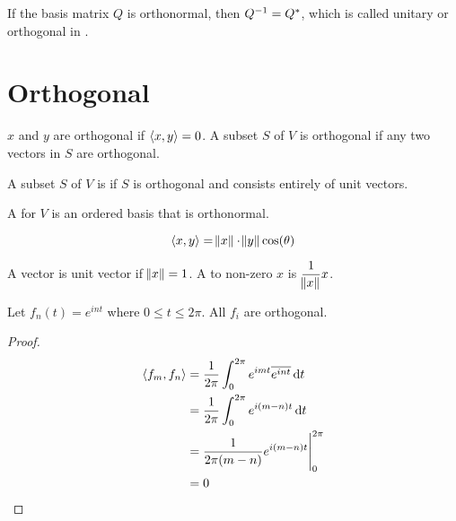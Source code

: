 If the basis matrix $Q$ is orthonormal, then ${Q}^{-1} = Q^*$, which is called unitary or orthogonal in .



\section{Orthogonal}

\begin{definition}
    $x$ and $y$ are orthogonal if $\innerproduct{x}{y} = 0$. A subset $S$ of $V$ is orthogonal if any two vectors in $S$ are orthogonal. 
    
    A subset $S$ of $V$ is  if $S$ is orthogonal and consists entirely of unit vectors.
    
    A  for $V$ is an ordered basis that is orthonormal.
\end{definition}


\begin{definition}
    \begin{equation}
        \innerproduct{x}{y} = \norm{x} \cdot \norm{y} \text{cos}(\theta)
    \end{equation}    
\end{definition}


\begin{definition}
	A vector is unit vector if $\norm{x} = 1$. A  to non-zero $x$ is $\dfrac{1}{\norm{x}} x$.
\end{definition}


\begin{theorem}
    Let $f_n (t) = e^{i nt}$ where $0 \leq t \leq 2 \pi$. All $f_i$ are orthogonal.
\end{theorem}
\begin{proof}
    \begin{equation}
        \begin{aligned}
            \innerproduct{f_m}{f_n} &= \frac{1}{2 \pi} \int_0^{2 \pi} e^{imt} \overline{e^{int}} \dif{t} \\
            &= \frac{1}{2\pi} \int_0^{2\pi} e^{i (m-n) t} \dif{t} \\
            &= \eval{\frac{1}{2\pi (m-n)} e^{i(m-n)t}}_0^{2\pi} \\
            &= 0
        \end{aligned}
    \end{equation}
\end{proof}

